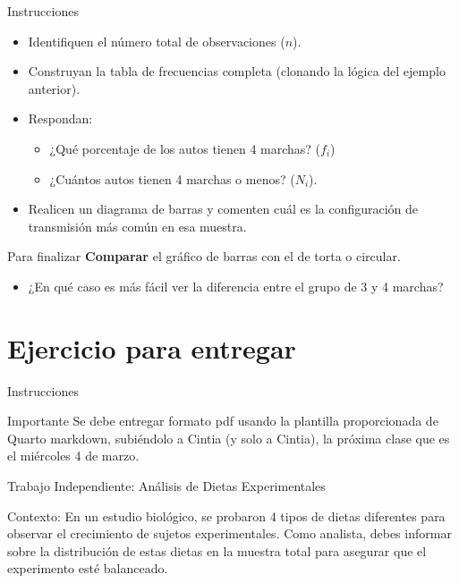 \documentclass[
  ignorenonframetext,
  aspectratio=169,
  spanish,
]{beamer}
\providecommand{\tightlist}{%
  \setlength{\itemsep}{0pt}\setlength{\parskip}{0pt}}
\begin{document}
\begin{frame}{Instrucciones}
\label{instrucciones}
\begin{itemize}
\item
  Identifiquen el número total de observaciones (\(n\)).
\item
  Construyan la tabla de frecuencias completa (clonando la lógica del
  ejemplo anterior).
\item
  Respondan:

  \begin{itemize}
  \item
    ¿Qué porcentaje de los autos tienen 4 marchas? (\(f_i\))
  \item
    ¿Cuántos autos tienen 4 marchas o menos? (\(N_i\)).
  \end{itemize}
\item
  Realicen un diagrama de barras y comenten cuál es la configuración de
  transmisión más común en esa muestra.
\end{itemize}
\end{frame}

\begin{frame}{Para finalizar}
\label{para-finalizar}
\textbf{Comparar} el gráfico de barras con el de torta o circular.

\begin{itemize}
\tightlist
\item
  ¿En qué caso es más fácil ver la diferencia entre el grupo de 3 y 4
  marchas?
\end{itemize}
\end{frame}

\section{Ejercicio para entregar}\label{ejercicio-para-entregar}

\begin{frame}{Instrucciones}
\label{instrucciones-1}
\begin{block}{Importante}
\label{importante}
Se debe entregar formato pdf usando la plantilla proporcionada de Quarto
markdown, subiéndolo a Cintia (y solo a Cintia), la próxima clase que es
el miércoles 4 de marzo.
\end{block}
\end{frame}

\begin{frame}{Trabajo Independiente: Análisis de Dietas Experimentales}
\label{trabajo-independiente-anuxe1lisis-de-dietas-experimentales}
\begin{block}{Contexto:}
\label{contexto-1}
En un estudio biológico, se probaron 4 tipos de dietas diferentes para
observar el crecimiento de sujetos experimentales. Como analista, debes
informar sobre la distribución de estas dietas en la muestra total para
asegurar que el experimento esté balanceado.
\end{block}
\end{frame}
\end{document}
